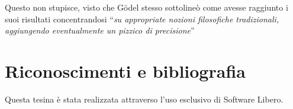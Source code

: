 \documentclass[a4paper,10pt]{article}
\begin{document}
Questo non stupisce, visto che Gödel stesso sottolineò come avesse raggiunto i suoi risultati concentrandosi \textquotedblleft\textit{su appropriate nozioni filosofiche tradizionali, aggiungendo eventualmente un pizzico di precisione}\textquotedblright \cite{odifreddi-e-ia}


\cleardoublepage

\section{Riconoscimenti e bibliografia}
Questa tesina è stata realizzata attraverso l'uso esclusivo di Software Libero.

\nocite{geb}



\end{document}
